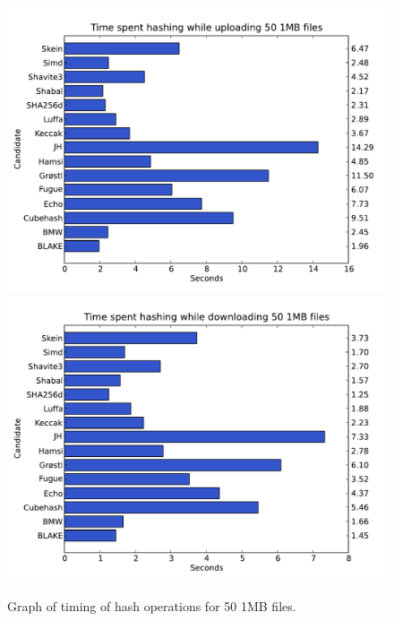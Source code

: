 \documentclass[english,12pt,a4paper]{book}
\begin{document}
\begin{figure}[h!]
    \centering
    \includegraphics[width=0.9\columnwidth]
        {graphs/Timespenthashingwhileuploading501MBfiles.pdf}
    \includegraphics[width=0.9\columnwidth]
        {graphs/Timespenthashingwhiledownloading501MBfiles.pdf}
    \caption{Graph of timing of hash operations for 50 1MB files.}
    \label{fig:graph:501mb}
\end{figure}
\end{document}

